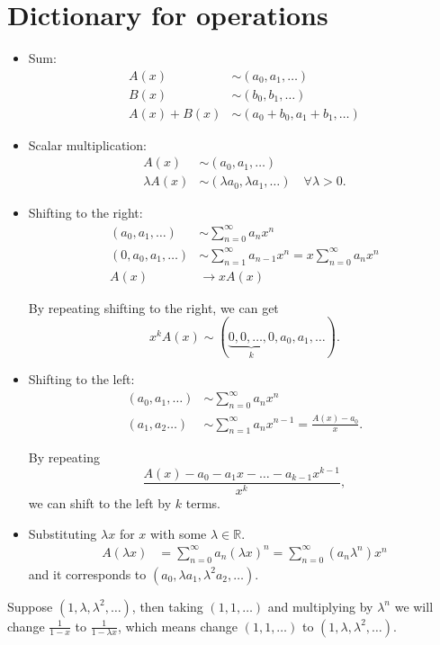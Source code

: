 \section{Dictionary for operations}
\begin{itemize}
    \item Sum: 
    \begin{align*}
        A(x) &\sim (a_0, a_1, \dots ) \\
        B(x) &\sim (b_0, b_1, \dots ) \\
        A(x) + B(x) &\sim (a_0 + b_0, a_1 + b_1, \dots )
    \end{align*}
    \item Scalar multiplication: 
    \begin{align*}
        A(x) &\sim (a_0, a_1, \dots ) \\
        \lambda A(x) &\sim  (\lambda a_0, \lambda a_1, \dots ) \quad \forall \lambda > 0. 
    \end{align*}
    \item Shifting to the right:
    \begin{align*}
        (a_0, a_1, \dots ) &\sim \sum_{n=0}^{\infty} a_n x^n \\
        (0, a_0, a_1, \dots ) &\sim \sum_{n=1}^{\infty} a_{n-1} x^n = x \sum_{n=0}^{\infty} a_n x^n \\
        A(x) &\to x A(x)  
    \end{align*}
    \begin{note}
        By repeating shifting to the right, we can get 
        \[
            x^k A(x) \sim ( \underbrace{0,0, \dots ,0}_{k}, a_0, a_1, \dots  ).  
        \]
    \end{note}
    \item Shifting to the left: 
    \begin{align*}
        (a_0, a_1, \dots ) &\sim \sum_{n=0}^{\infty} a_n x^n \\
        (a_1, a_2 \dots ) &\sim \sum_{n=1}^{\infty} a_n x^{n-1} = \frac{A(x) - a_0}{x}.  
    \end{align*}
    \begin{note}
        By repeating 
        \[
            \frac{A(x) - a_0 - a_1 x - \dots - a_{k-1} x^{k-1}}{x^k},
        \] we can shift to the left by \(k\) terms. 
    \end{note}
    \item Substituting \(\lambda x\) for \(x\) with some \(\lambda \in \mathbb{R} \). 
    \begin{align*}
        A(\lambda x) &= \sum_{n=0}^{\infty} a_n \left( \lambda x \right)^n = \sum_{n=0}^{\infty} \left( a_n \lambda ^n \right) x^n     
    \end{align*}
    and it corresponds to \((a_0, \lambda a_1, \lambda ^2 a_2, \dots )\). 
\end{itemize}

\begin{eg}
    Suppose \((1, \lambda , \lambda ^2, \dots )\), then taking \((1, 1, \dots )\) and multiplying by \(\lambda ^n\) we will change \(\frac{1}{1-x}\) to \(\frac{1}{1-\lambda x}\), which means change \((1,1,\dots )\) to \((1, \lambda , \lambda ^2, \dots )\).     
\end{eg}
